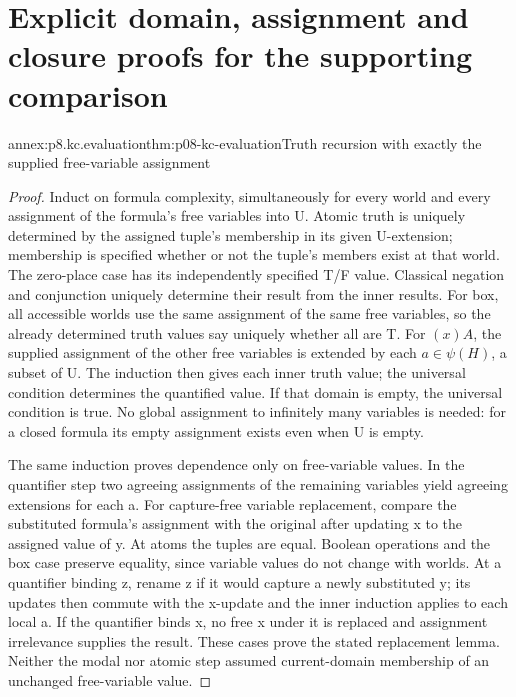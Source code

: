 \section{Explicit domain, assignment and closure proofs for the supporting comparison}

\begin{annexitem}{annex:p8.kc.evaluation}{thm:p08-kc-evaluation}{Truth recursion with exactly the supplied free-variable assignment}
\begin{proof}
Induct on formula complexity, simultaneously for every world and
every assignment of the formula's free variables into U. Atomic
truth is uniquely determined by the assigned tuple's membership
in its given U-extension; membership is specified whether or
not the tuple's members exist at that world. The zero-place
case has its independently specified T/F value. Classical
negation and conjunction uniquely determine their result from
the inner results. For box, all accessible worlds use the same
assignment of the same free variables, so the already determined
truth values say uniquely whether all are T. For \((x)A\),
the supplied assignment of the other free variables is extended
by each \(a\in\psi(H)\), a subset of U. The induction then
gives each inner truth value; the universal condition determines
the quantified value. If that domain is empty, the universal
condition is true. No global assignment to infinitely many
variables is needed: for a closed formula its empty assignment
exists even when U is empty.

The same induction proves dependence only on free-variable
values. In the quantifier step two agreeing assignments of the
remaining variables yield agreeing extensions for each a. For
capture-free variable replacement, compare the substituted
formula's assignment with the original after updating x to
the assigned value of y. At atoms the tuples are equal. Boolean
operations and the box case preserve equality, since variable
values do not change with worlds. At a quantifier binding z,
rename z if it would capture a newly substituted y; its updates
then commute with the x-update and the inner induction applies
to each local a. If the quantifier binds x, no free x under it
is replaced and assignment irrelevance supplies the result.
These cases prove the stated replacement lemma. Neither the
modal nor atomic step assumed current-domain membership of
an unchanged free-variable value.
\end{proof}
\end{annexitem}

